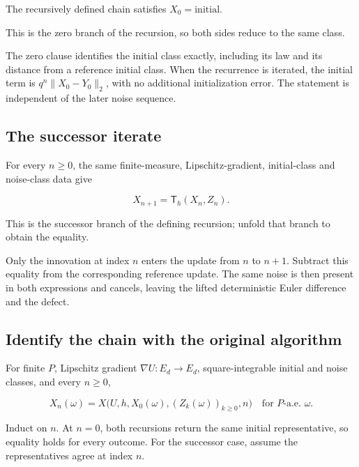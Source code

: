 \documentclass[11pt,a4paper]{report}
\begin{document}
The recursively defined chain satisfies \(X_0=\mathrm{initial}\).



This is the zero branch of the recursion, so both sides reduce to the same class.



The zero clause identifies the initial class exactly, including its law and its distance from a reference initial class. When the recurrence is iterated, the initial term is \(q^n\|X_0-Y_0\|_2\), with no additional initialization error. The statement is independent of the later noise sequence.

\subsection{\texorpdfstring{The successor iterate}{The successor iterate}}
\label{report-step-UnadjustedLangevin-LpDrift-lean-15}


For every \(n\ge0\), the same finite-measure, Lipschitz-gradient, initial-class and noise-class data give

\[X_{n+1}=\mathsf T_h(X_n,Z_n).\]

This is the successor branch of the defining recursion; unfold that branch to obtain the equality.



Only the innovation at index \(n\) enters the update from \(n\) to \(n+1\). Subtract this equality from the corresponding reference update. The same noise is then present in both expressions and cancels, leaving the lifted deterministic Euler difference and the defect.

\subsection{\texorpdfstring{Identify the chain with the original algorithm}{Identify the chain with the original algorithm}}
\label{report-step-UnadjustedLangevin-LpDrift-lean-16}


For finite \(P\), Lipschitz gradient \(\nabla U:E_d\to E_d\), square-integrable initial and noise classes, and every \(n\ge0\),

\[X_n(\omega)=X\bigl(U,h,X_0(\omega),(Z_k(\omega))_{k\ge0},n\bigr)\quad\text{for }P\text{-a.e. }\omega.\]

Induct on \(n\). At \(n=0\), both recursions return the same initial representative, so equality holds for every outcome. For the successor case, assume the representatives agree at index \(n\).
\end{document}
